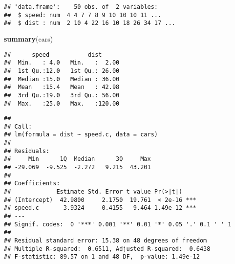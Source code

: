 \documentclass[]{article}
\newenvironment{Shaded}{\begin{snugshade}}{\end{snugshade}}
\newcommand{\KeywordTok}[1]{\textcolor[rgb]{0.13,0.29,0.53}{\textbf{#1}}}
\newcommand{\DataTypeTok}[1]{\textcolor[rgb]{0.13,0.29,0.53}{#1}}
\newcommand{\DecValTok}[1]{\textcolor[rgb]{0.00,0.00,0.81}{#1}}
\newcommand{\StringTok}[1]{\textcolor[rgb]{0.31,0.60,0.02}{#1}}
\newcommand{\CommentTok}[1]{\textcolor[rgb]{0.56,0.35,0.01}{\textit{#1}}}
\newcommand{\OtherTok}[1]{\textcolor[rgb]{0.56,0.35,0.01}{#1}}
\newcommand{\OperatorTok}[1]{\textcolor[rgb]{0.81,0.36,0.00}{\textbf{#1}}}
\newcommand{\NormalTok}[1]{#1}
\begin{document}
\begin{verbatim}
## 'data.frame':    50 obs. of  2 variables:
##  $ speed: num  4 4 7 7 8 9 10 10 10 11 ...
##  $ dist : num  2 10 4 22 16 10 18 26 34 17 ...
\end{verbatim}

\begin{Shaded}
\begin{Highlighting}[]
\KeywordTok{summary}\NormalTok{(cars)}
\end{Highlighting}
\end{Shaded}

\begin{verbatim}
##      speed           dist       
##  Min.   : 4.0   Min.   :  2.00  
##  1st Qu.:12.0   1st Qu.: 26.00  
##  Median :15.0   Median : 36.00  
##  Mean   :15.4   Mean   : 42.98  
##  3rd Qu.:19.0   3rd Qu.: 56.00  
##  Max.   :25.0   Max.   :120.00
\end{verbatim}

\begin{Shaded}
\end{Shaded}

\begin{verbatim}
## 
## Call:
## lm(formula = dist ~ speed.c, data = cars)
## 
## Residuals:
##     Min      1Q  Median      3Q     Max 
## -29.069  -9.525  -2.272   9.215  43.201 
## 
## Coefficients:
##             Estimate Std. Error t value Pr(>|t|)    
## (Intercept)  42.9800     2.1750  19.761  < 2e-16 ***
## speed.c       3.9324     0.4155   9.464 1.49e-12 ***
## ---
## Signif. codes:  0 '***' 0.001 '**' 0.01 '*' 0.05 '.' 0.1 ' ' 1
## 
## Residual standard error: 15.38 on 48 degrees of freedom
## Multiple R-squared:  0.6511, Adjusted R-squared:  0.6438 
## F-statistic: 89.57 on 1 and 48 DF,  p-value: 1.49e-12
\end{verbatim}
\end{document}
